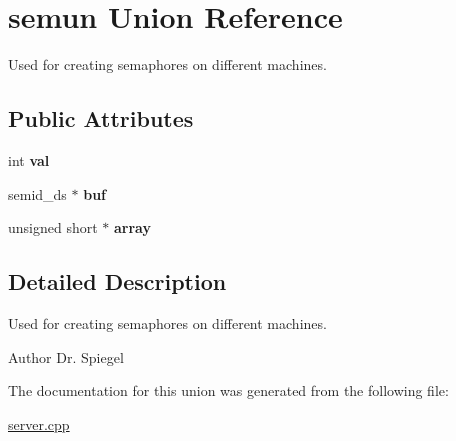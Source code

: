 \hypertarget{unionsemun}{
\section{semun Union Reference}
\label{unionsemun}
}


Used for creating semaphores on different machines.  
\subsection*{Public Attributes}
\begin{DoxyCompactItemize}
\item 
\hypertarget{unionsemun_ac6121ecb6d04a024e07e12bd71b94031}{
int {\bfseries val}}
\label{unionsemun_ac6121ecb6d04a024e07e12bd71b94031}

\item 
\hypertarget{unionsemun_ad0fa26953ba1fa2cb1bac80ecbecae03}{
semid\_\-ds $\ast$ {\bfseries buf}}
\label{unionsemun_ad0fa26953ba1fa2cb1bac80ecbecae03}

\item 
\hypertarget{unionsemun_aca23b8e730a0553205813c0cb7692b54}{
unsigned short $\ast$ {\bfseries array}}
\label{unionsemun_aca23b8e730a0553205813c0cb7692b54}

\end{DoxyCompactItemize}


\subsection{Detailed Description}
Used for creating semaphores on different machines. \begin{DoxyAuthor}{Author}
Dr. Spiegel 
\end{DoxyAuthor}


The documentation for this union was generated from the following file:\begin{DoxyCompactItemize}
\item 
\hyperlink{server_8cpp}{server.cpp}\end{DoxyCompactItemize}
